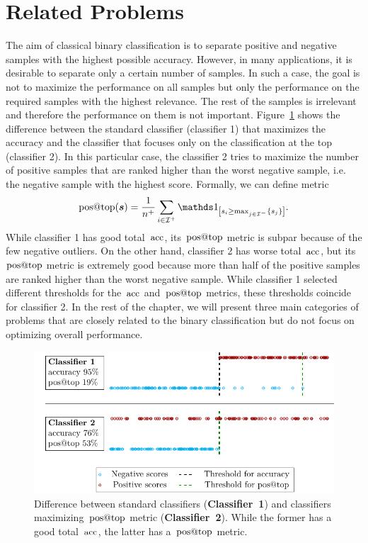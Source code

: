 \section{Related Problems}

The aim of classical binary classification is to separate positive and negative samples with the highest possible accuracy. However, in many applications, it is desirable to separate only a certain number of samples. In such a case, the goal is not to maximize the performance on all samples but only the performance on the required samples with the highest relevance. The rest of the samples is irrelevant and therefore the performance on them is not important. Figure~\ref{fig: standard vs. aatp} shows the difference between the standard classifier (classifier 1) that maximizes the accuracy and the classifier that focuses only on the classification at the top (classifier 2). In this particular case, the classifier 2 tries to maximize the number of positive samples that are ranked higher than the worst negative sample, i.e. the negative sample with the highest score. Formally, we can define metric
\begin{equation*}
  \postop(\bm{s}) = \frac{1}{n^+} \sum_{i \in \I^+} \Iverson{s_i \ge \max_{j \in \I^-}\{s_j\}}.
\end{equation*}
While classifier 1 has good total~$\operatorname{acc}$, its~$\operatorname{pos@top}$ metric is subpar because of the few negative outliers. On the other hand, classifier 2 has worse total~$\operatorname{acc}$, but its~$\operatorname{pos@top}$ metric is extremely good because more than half of the positive samples are ranked higher than the worst negative sample. While classifier 1 selected different thresholds for the~$\operatorname{acc}$ and~$\operatorname{pos@top}$ metrics, these thresholds coincide for classifier 2. In the rest of the chapter, we will present three main categories of problems that are closely related to the binary classification but do not focus on optimizing overall performance.

\begin{figure}[t]
  \centering
  \includegraphics[width = 0.95\linewidth]{images/standard_aatp_comparison.pdf}
  \caption{Difference between standard classifiers (\textbf{Classifier~1}) and classifiers maximizing~$\operatorname{pos@top}$ metric (\textbf{Classifier~2}). While the former has a good total~$\operatorname{acc}$, the latter has a~$\operatorname{pos@top}$ metric.}
  \label{fig: standard vs. aatp}
\end{figure}

